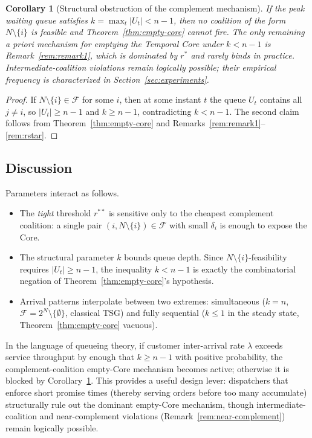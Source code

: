 \documentclass[11pt]{article}
\theoremstyle{plain}
\newtheorem{corollary}[theorem]{Corollary}
\theoremstyle{definition}
\theoremstyle{remark}
\newcommand{\F}{\mathcal{F}}
\begin{document}
\begin{corollary}[Structural obstruction of the complement mechanism]
\label{cor:cor52}
If the peak waiting queue satisfies $k=\max_t |U_t| < n-1$, then no coalition of the form $N\setminus\{i\}$ is feasible and Theorem~\ref{thm:empty-core} cannot fire. The only remaining \emph{a priori} mechanism for emptying the Temporal Core under $k<n-1$ is Remark~\ref{rem:remark1}, which is dominated by $r^{\ast}$ and rarely binds in practice. Intermediate-coalition violations remain logically possible; their empirical frequency is characterized in Section~\ref{sec:experiments}.
\end{corollary}

\begin{proof}
If $N\setminus\{i\}\in\F$ for some $i$, then at some instant $t$ the queue $U_t$ contains all $j\neq i$, so $|U_t|\ge n-1$ and $k\ge n-1$, contradicting $k<n-1$. The second claim follows from Theorem~\ref{thm:empty-core} and Remarks~\ref{rem:remark1}--\ref{rem:rstar}.
\end{proof}

\subsection{Discussion}
\label{ssec:discussion}

Parameters interact as follows.
\begin{itemize}[leftmargin=1.5em]
\item The \emph{tight} threshold $r^{\ast\ast}$ is sensitive only to the cheapest complement coalition: a single pair $(i,N\setminus\{i\})\in\F$ with small $\delta_i$ is enough to expose the Core.
\item The structural parameter $k$ bounds queue depth. Since $N\setminus\{i\}$-feasibility requires $|U_t|\ge n-1$, the inequality $k<n-1$ is exactly the combinatorial negation of Theorem~\ref{thm:empty-core}'s hypothesis.
\item Arrival patterns interpolate between two extremes: simultaneous ($k=n$, $\F=2^N\setminus\{\emptyset\}$, classical TSG) and fully sequential ($k\le 1$ in the steady state, Theorem~\ref{thm:empty-core} vacuous).
\end{itemize}
In the language of queueing theory, if customer inter-arrival rate $\lambda$ exceeds service throughput by enough that $k\ge n-1$ with positive probability, the complement-coalition empty-Core mechanism becomes active; otherwise it is blocked by Corollary~\ref{cor:cor52}. This provides a useful design lever: dispatchers that enforce short promise times (thereby serving orders before too many accumulate) structurally rule out the dominant empty-Core mechanism, though intermediate-coalition and near-complement violations (Remark~\ref{rem:near-complement}) remain logically possible.
\end{document}
